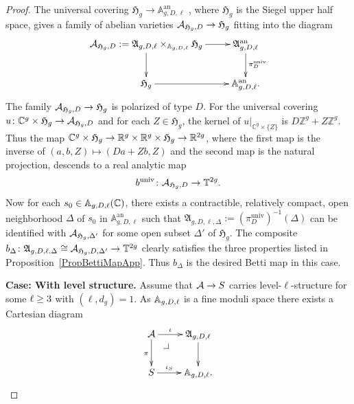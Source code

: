 \begin{proof}
The universal covering $\mathfrak{H}_g \rightarrow \mathbb
A_{g,D,\ell}^{\mathrm{an}}$ \cite[Proposition~1.3.2]{GenestierNgo},
where $\mathfrak{H}_g$ is the Siegel upper half space, gives a family of abelian varieties
$\mathcal{A}_{\mathfrak{H}_g,D} \rightarrow \mathfrak{H}_g$ %
fitting into the diagram
\[
\xymatrix{
\cA_{\mathfrak{H}_g,D} := \mathfrak{A}_{g,D,\ell} \times_{\mathbb A_{g,D,\ell}}\mathfrak{H}_g \ar[r] \ar[d] & \mathfrak{A}_{g,D,\ell}^{\mathrm{an}} \ar[d]^{\pi^{\mathrm{univ}}_D} \\
\mathfrak{H}_g \ar[r] & \mathbb A_{g,D,\ell}^{\mathrm{an}}.
}
\]
The family $\mathcal{A}_{\mathfrak{H}_g,D} \rightarrow \mathfrak{H}_g$ is polarized of type $D$. 
For the universal covering
$u \colon {\mathbb{C}}^g \times \mathfrak{H}_g \rightarrow \mathcal{A}_{\mathfrak{H}_g,D}$
and for each $Z\in \mathfrak{H}_g$, the kernel of
$u|_{\mathbb{C}^g \times \{Z\}}$ is $D\mathbb{Z}^g + Z \mathbb{Z}^g$.
Thus the map
${\mathbb{C}}^g \times \mathfrak{H}_g \rightarrow {\mathbb{R}}^g \times {\mathbb{R}}^g \times \mathfrak{H}_g \rightarrow {\mathbb{R}}^{2g}$,
where the first map is the inverse of $(a,b,Z) \mapsto (Da + Z  b,Z)$
and the second map is the natural projection, descends to a real
analytic map
\[
b^{\mathrm{univ}} \colon \mathcal{A}_{\mathfrak{H}_g,D} \rightarrow \mathbb T^{2g}.
\]
 Now for each $s_0 \in \mathbb A_{g,D,\ell}({\mathbb{C}})$, there exists a
 contractible, relatively compact, open neighborhood $\Delta$ of $s_0$ in $\mathbb A_{g,D,\ell}^{\mathrm{an}}$ such that $\mathfrak{A}_{g,D,\ell,\Delta}:=(\pi^{\mathrm{univ}}_D)^{-1}(\Delta)$ can be identified with $\mathcal{A}_{\mathfrak{H}_g,\Delta'}$ for some open subset $\Delta'$ of $\mathfrak{H}_g$. The composite $b_{\Delta} \colon \mathfrak{A}_{g,D,\ell,\Delta} \cong \mathcal{A}_{\mathfrak{H}_g,D,\Delta'} \rightarrow \mathbb T^{2g}$ clearly  satisfies the three properties listed in Proposition~\ref{PropBettiMapApp}. Thus $b_{\Delta}$ is the desired Betti map in this case.%

\medskip
  \textbf{Case: With level structure.} 
  Assume that $\mathcal{A} \rightarrow S$ carries level-$\ell$-structure for some $\ell \ge 3$ with $(\ell,d_g) = 1$. 
As ${\mathbb{A}}_{g,D,\ell}$ is a fine moduli space there exists a Cartesian diagram
\begin{equation*}%
\xymatrix{
\cA \ar[r]^-{\iota} \ar[d]_{\pi} \pullbackcorner & \mathfrak{A}_{g,D,\ell} \ar[d] \\
S \ar[r]^-{\iota_S} & \mathbb{A}_{g,D,\ell}.
}
\end{equation*}


\end{proof}
